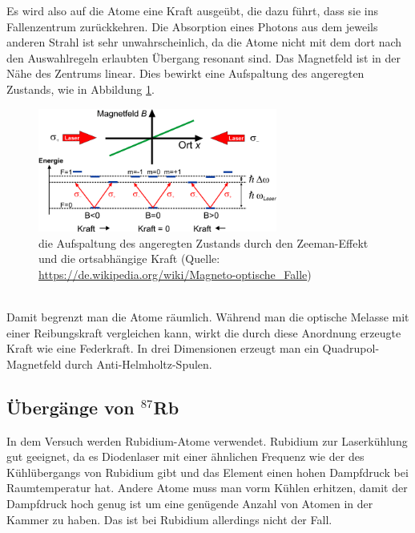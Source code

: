 \documentclass[12pt, a4paper]{article}
\begin{document}
  Es wird also auf die Atome eine Kraft ausgeübt, die dazu führt, dass sie ins Fallenzentrum zurückkehren. Die Absorption eines Photons aus dem jeweils anderen Strahl ist sehr unwahrscheinlich, da die Atome nicht mit dem dort nach den Auswahlregeln erlaubten Übergang resonant sind. Das Magnetfeld ist in der Nähe des Zentrums linear. Dies bewirkt eine Aufspaltung des angeregten Zustands, wie in Abbildung \ref{zeemanmot}.
  \begin{figure}[h!]
  \centering
  \includegraphics[width=0.7\textwidth]{Mot_posforce.png}
  \caption{die Aufspaltung des angeregten Zustands durch den Zeeman-Effekt und die ortsabhängige Kraft (Quelle: \url{https://de.wikipedia.org/wiki/Magneto-optische_Falle})}
  \label{zeemanmot}
  \end{figure}\\
 Damit begrenzt man die Atome räumlich. Während man die optische Melasse mit einer Reibungskraft vergleichen kann, wirkt die durch diese Anordnung erzeugte Kraft wie eine Federkraft. In drei Dimensionen erzeugt man ein Quadrupol-Magnetfeld durch Anti-Helmholtz-Spulen.
  \subsection{Übergänge von ${}^{87}$Rb}
  In dem Versuch werden Rubidium-Atome verwendet. Rubidium zur Laserkühlung gut geeignet, da es Diodenlaser mit einer ähnlichen Frequenz wie der des Kühlübergangs von Rubidium gibt und das Element einen hohen Dampfdruck bei Raumtemperatur hat. Andere Atome muss man vorm Kühlen erhitzen, damit der Dampfdruck hoch genug ist um eine genügende Anzahl von Atomen in der Kammer zu haben. Das ist bei Rubidium allerdings nicht der Fall.
  
\end{document}
